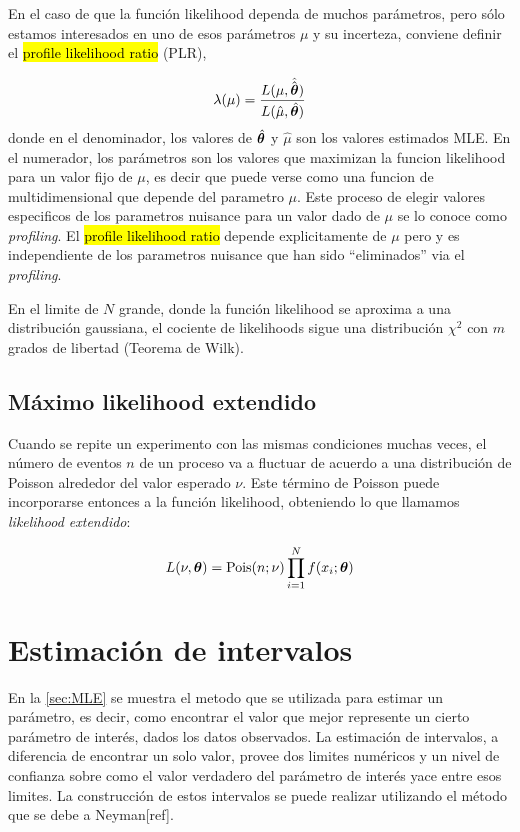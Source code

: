 En el caso de que la función likelihood dependa de muchos parámetros, pero sólo
estamos interesados en uno de esos parámetros $\mu$ y su incerteza,
conviene definir el \hl{profile likelihood ratio} (PLR),

\begin{equation}
  \lambda(\mu) = \frac{L(\mu,\hat{\hat{\bm{\theta}}})}{L(\hat{\mu},\hat{\bm{\theta}})}
\end{equation}
%
donde en el denominador, los valores de $\hat{\bm{\theta}}$ y $\hat{\mu}$ son los valores
estimados MLE.
En el numerador, los parámetros {\btheta} son los valores que maximizan
la funcion likelihood para un valor fijo de $\mu$, es decir que puede verse
como una funcion de multidimensional que depende del parametro $\mu$.
Este proceso de elegir valores especificos de los parametros nuisance para un
valor dado de $\mu$ se lo conoce como \emph{profiling}. El \hl{profile likelihood ratio}
depende explicitamente de $\mu$ pero y es independiente de los parametros
nuisance que han sido ``eliminados'' via el \emph{profiling}.

En el limite de $N$ grande, donde la función likelihood se aproxima a una
distribución gaussiana, el cociente de likelihoods sigue una distribución
$\chi^2$ con $m$ grados de libertad (Teorema de Wilk).


\subsection{Máximo likelihood extendido}

Cuando se repite un experimento con las mismas condiciones muchas veces, el
número de eventos $n$ de un proceso va a fluctuar de acuerdo a una distribución
de Poisson alrededor del valor esperado $\nu$. Este término de Poisson puede
incorporarse entonces a la función likelihood, obteniendo lo que llamamos
\emph{likelihood extendido}:

\begin{equation}
  L(\nu,\bm{\theta}) = \operatorname{Pois}(n;\nu) \prod_{i=1}^{N} f(x_i; \bm{\theta})
\end{equation}


\section{Estimación de intervalos}

En la \cref{sec:MLE} se muestra el metodo que se utilizada para estimar un
parámetro, es decir, como encontrar el valor que mejor represente un cierto
parámetro de interés, dados los datos observados. La estimación de intervalos,
a diferencia de encontrar un solo valor, provee dos limites numéricos y un nivel de
confianza sobre como el valor verdadero del parámetro de interés yace entre esos
limites. La construcción de estos intervalos se puede realizar utilizando el
método que se debe a Neyman[ref].

